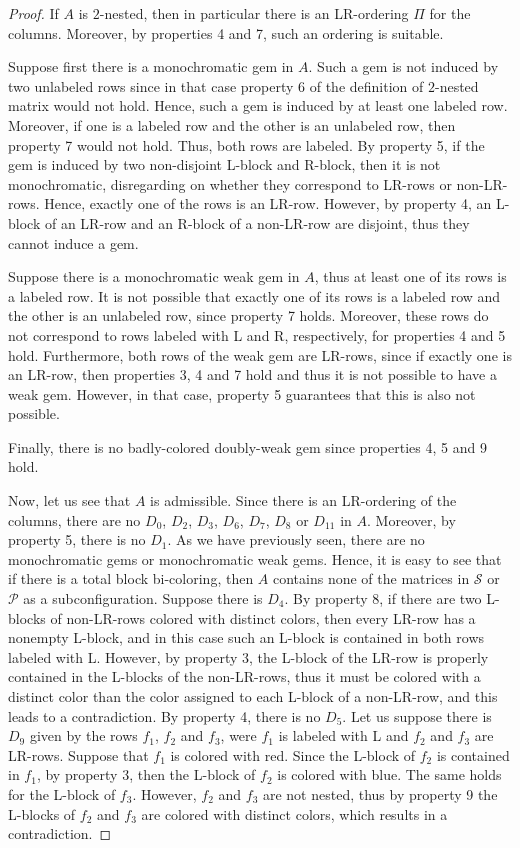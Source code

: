 \documentclass[12pt]{book}
\theoremstyle{plain}
\theoremstyle{remark}
\begin{document}
\begin{proof}

If $A$ is $2$-nested, then in particular there is an LR-ordering $\Pi$ for the columns. Moreover, by properties 4 and 7, such an ordering is suitable.

Suppose first there is a monochromatic gem in $A$. Such a gem is not induced by two unlabeled rows since in that case property 6 of the definition of $2$-nested matrix would not hold. Hence, such a gem is induced by at least one labeled row. Moreover, if one is a labeled row and the other is an unlabeled row, then property 7 would not hold. Thus, both rows are labeled. By property 5, if the gem is induced by two non-disjoint L-block and R-block, then it is not monochromatic, disregarding on whether they correspond to LR-rows or non-LR-rows. Hence, exactly one of the rows is an LR-row. However, by property 4, an L-block of an LR-row and an R-block of a non-LR-row are disjoint, thus they cannot induce a gem. 

Suppose there is a monochromatic weak gem in $A$, thus at least one of its rows is a labeled row. It is not possible that exactly one of its rows is a labeled row and the other is an unlabeled row, since property 7 holds. Moreover, these rows do not correspond to rows labeled with L and R, respectively, for properties 4 and 5 hold. Furthermore, both rows of the weak gem are LR-rows, since if exactly one is an LR-row, then properties 3, 4 and 7 hold and thus it is not possible to have a weak gem. However, in that case, property 5 guarantees that this is also not possible.

Finally, there is no badly-colored doubly-weak gem since properties 4, 5 and 9 hold. 

\vspace{1mm}
Now, let us see that $A$ is admissible. Since there is an LR-ordering of the columns, there are no $D_0$, $D_2$, $D_3$, $D_6$, $D_7$, $D_8$ or $D_{11}$ in $A$. Moreover, by property 5, there is no $D_1$.  	%
As we have previously seen, there are no monochromatic gems or monochromatic weak gems. Hence, it is easy to see that if there is a total block bi-coloring, then $A$ contains none of the matrices in $\mathcal{S}$ or $\mathcal{P}$ as a subconfiguration.
Suppose there is $D_4$. By property 8, if there are two L-blocks of non-LR-rows colored with distinct colors, then every LR-row has a nonempty L-block, and in this case such an L-block is contained in both rows labeled with L. However, by property 3, the L-block of the LR-row is properly contained in the L-blocks of the non-LR-rows, thus it must be colored with a distinct color than the color assigned to each L-block of a non-LR-row, and this leads to a contradiction.
By property 4, there is no $D_5$. 
Let us suppose there is $D_9$ given by the rows $f_1$, $f_2$ and $f_3$, were $f_1$ is labeled with L and $f_2$ and $f_3$ are LR-rows. Suppose that $f_1$ is colored with red. Since the L-block of $f_2$ is contained in $f_1$, by property 3, then the L-block of $f_2$ is colored with blue. The same holds for the L-block of $f_3$. However, $f_2$ and $f_3$ are not nested, thus by property 9 the L-blocks of $f_2$ and $f_3$ are colored with distinct colors, which results in a contradiction.


\end{proof}
\end{document}
